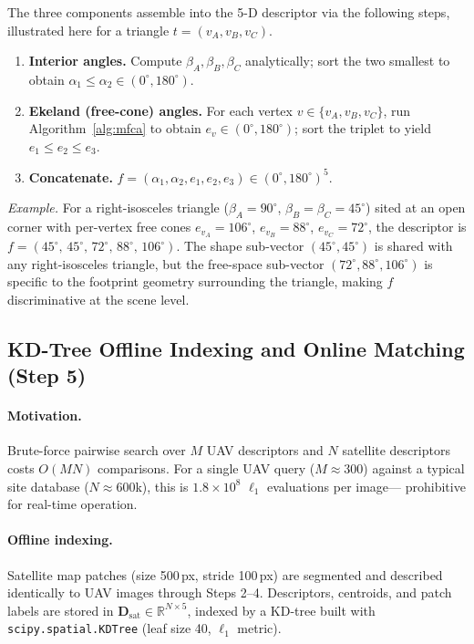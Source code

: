\documentclass[10pt]{article}
\theoremstyle{plain}
\theoremstyle{definition}
\begin{document}
The three components assemble into the 5-D descriptor via the following
steps, illustrated here for a triangle $t = (v_A, v_B, v_C)$.
\begin{enumerate}[label=\textbf{Step \arabic*.},leftmargin=*,topsep=3pt]
\item \textbf{Interior angles.}
  Compute $\beta_A, \beta_B, \beta_C$ analytically; sort the two smallest
  to obtain $\alpha_1 \le \alpha_2 \in (0^\circ, 180^\circ)$.
\item \textbf{Ekeland (free-cone) angles.}
  For each vertex $v \in \{v_A, v_B, v_C\}$, run
  Algorithm~\ref{alg:mfca} to obtain $e_v \in (0^\circ, 180^\circ)$;
  sort the triplet to yield $e_1 \le e_2 \le e_3$.
\item \textbf{Concatenate.}
  $f = (\alpha_1, \alpha_2, e_1, e_2, e_3) \in (0^\circ, 180^\circ)^5$.
\end{enumerate}

\noindent\textit{Example.}
For a right-isosceles triangle ($\beta_A = 90^\circ$, $\beta_B = \beta_C =
45^\circ$) sited at an open corner with per-vertex free cones
$e_{v_A} = 106^\circ$, $e_{v_B} = 88^\circ$, $e_{v_C} = 72^\circ$,
the descriptor is $f = (45^\circ,\, 45^\circ,\, 72^\circ,\, 88^\circ,\,
106^\circ)$.
The shape sub-vector $(45^\circ, 45^\circ)$ is shared with any right-isosceles
triangle, but the free-space sub-vector $(72^\circ, 88^\circ, 106^\circ)$
is specific to the footprint geometry surrounding the triangle, making $f$
discriminative at the scene level.


\subsection{KD-Tree Offline Indexing and Online Matching (Step 5)}
\label{sec:kdtree}

\paragraph{Motivation.}
Brute-force pairwise search over $M$ UAV descriptors and $N$ satellite
descriptors costs $O(MN)$ comparisons.
For a single UAV query ($M \approx 300$) against a typical site database
($N \approx 600$k), this is $1.8 \times 10^8$ $\ell_1$ evaluations per image---
prohibitive for real-time operation.

\paragraph{Offline indexing.}
Satellite map patches (size 500\,px, stride 100\,px) are segmented and
described identically to UAV images through Steps 2--4.
Descriptors, centroids, and patch labels are stored in
$\mathbf{D}_{\mathrm{sat}} \in \mathbb{R}^{N \times 5}$, indexed by a
KD-tree built with \texttt{scipy.spatial.KDTree} (leaf size 40, $\ell_1$ metric).
\end{document}
